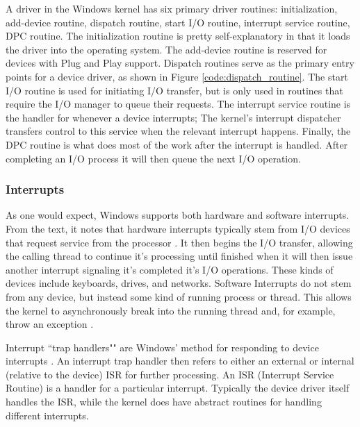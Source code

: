 \documentclass[10pt,draftclsnofoot,onecolumn]{IEEEtran}
\begin{document}
\par A driver in the Windows kernel has six primary driver routines: initialization, add-device routine, dispatch routine, start I/O routine, interrupt service routine, DPC routine.
The initialization routine is pretty self-explanatory in that it loads the driver into the operating system.
The add-device routine is reserved for devices with Plug and Play support.
Dispatch routines serve as the primary entry points for a device driver, as shown in Figure \ref{code:dispatch_routine}.
The start I/O routine is used for initiating I/O transfer, but is only used in routines that require the I/O manager to queue their requests.
The interrupt service routine is the handler for whenever a device interrupts; The kernel's interrupt dispatcher transfers control to this service when the relevant interrupt happens.
Finally, the DPC routine is what does most of the work after the interrupt is handled.
After completing an I/O process it will then queue the next I/O operation.\\

\subsubsection{Interrupts}
\label{sub:Interrupts Windows}
\par As one would expect, Windows supports both hardware and software interrupts.
From the text, it notes that hardware interrupts typically stem from I/O devices that request service from the processor \cite{win:1}.
It then begins the I/O transfer, allowing the calling thread to continue it's processing until finished when it will then issue another interrupt signaling it's completed it's I/O operations.
These kinds of devices include keyboards, drives, and networks.
Software Interrupts do not stem from any device, but instead some kind of running process or thread.
This allows the kernel to asynchronously break into the running thread and, for example, throw an exception \cite{win:1}.

\par Interrupt ``trap handlers"" are Windows' method for responding to device interrupts \cite{win:1}.
An interrupt trap handler then refers to either an external or internal (relative to the device) ISR for further processing.
An ISR (Interrupt Service Routine) is a handler for a particular interrupt.
Typically the device driver itself handles the ISR, while the kernel does have abstract routines for handling different interrupts.
\end{document}
